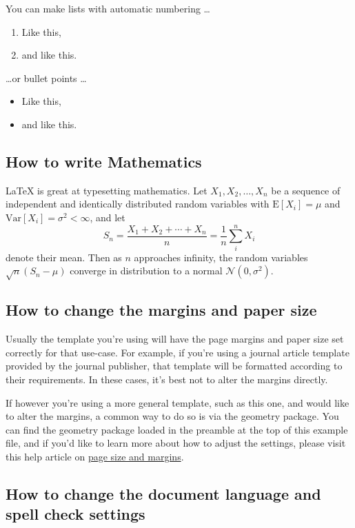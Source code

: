 \documentclass{article}
\begin{document}
You can make lists with automatic numbering \dots

\begin{enumerate}
\item Like this,
\item and like this.
\end{enumerate}
\dots or bullet points \dots
\begin{itemize}
\item Like this,
\item and like this.
\end{itemize}

\subsection{How to write Mathematics}

\LaTeX{} is great at typesetting mathematics. Let $X_1, X_2, \ldots, X_n$ be a sequence of independent and identically distributed random variables with $\text{E}[X_i] = \mu$ and $\text{Var}[X_i] = \sigma^2 < \infty$, and let
\[S_n = \frac{X_1 + X_2 + \cdots + X_n}{n}
      = \frac{1}{n}\sum_{i}^{n} X_i\]
denote their mean. Then as $n$ approaches infinity, the random variables $\sqrt{n}(S_n - \mu)$ converge in distribution to a normal $\mathcal{N}(0, \sigma^2)$.


\subsection{How to change the margins and paper size}

Usually the template you're using will have the page margins and paper size set correctly for that use-case. For example, if you're using a journal article template provided by the journal publisher, that template will be formatted according to their requirements. In these cases, it's best not to alter the margins directly.

If however you're using a more general template, such as this one, and would like to alter the margins, a common way to do so is via the geometry package. You can find the geometry package loaded in the preamble at the top of this example file, and if you'd like to learn more about how to adjust the settings, please visit this help article on \href{https://www.overleaf.com/learn/latex/page_size_and_margins}{page size and margins}.

\subsection{How to change the document language and spell check settings}
\end{document}
